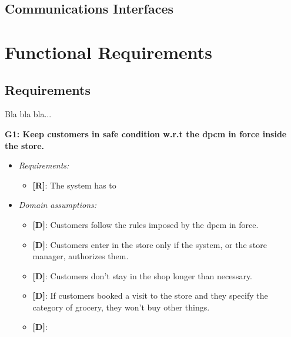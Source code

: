 \subsection{Communications Interfaces}

\section{Functional Requirements}

\subsection{Requirements}

Bla bla bla...

\textbf{G1: Keep customers in safe condition w.r.t the \gls{dpcm} in force inside the store.}
\begin{itemize}
\item \textit{Requirements:}
\begin{itemize}
	\item {\textbf{[R]}}: The system has to
\end{itemize}

\item \textit{Domain assumptions:}
\begin{itemize}
	\item {\textbf{[D]}}: Customers follow the rules imposed by the \gls{dpcm} in force.
	\item {\textbf{[D]}}: Customers enter in the store only if the system, or the store manager, authorizes them.
	\item {\textbf{[D]}}: Customers don't stay in the shop longer than necessary.
	\item {\textbf{[D]}}: If customers booked a visit to the store and they specify the category of grocery, they won't buy other things.
	\item {\textbf{[D]}}: 
\end{itemize}
\end{itemize}

